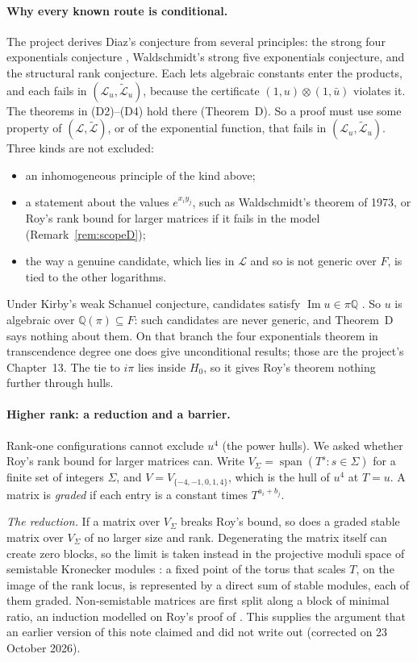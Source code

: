 \documentclass[11pt,a4paper]{article}
\theoremstyle{plain}
\theoremstyle{definition}
\newcommand{\Q}{\mathbb{Q}}
\newcommand{\cL}{\mathcal{L}}
\newcommand{\Lt}{\widetilde{\mathcal{L}}}
\newcommand{\spn}{\operatorname{span}}
\renewcommand{\Im}{\operatorname{Im}}
\begin{document}
\paragraph{Why every known route is conditional.}
The project derives Diaz's conjecture from several principles: the strong four
exponentials conjecture \cite[Conj.~11.17]{Wal00}, Waldschmidt's strong five exponentials
conjecture, and the structural rank conjecture. Each lets algebraic constants enter the
products, and each fails in $(\cL_{u},\Lt_{u})$, because the certificate
$(1,u)\otimes(1,\bar u)$ violates it. The theorems in (D2)--(D4) hold there (Theorem~D).
So a proof must use some property of $(\cL,\Lt)$, or of the exponential function, that
fails in $(\cL_{u},\Lt_{u})$. Three kinds are not excluded:
\begin{itemize}
\item an inhomogeneous principle of the kind above;
\item a statement about the values $e^{x_{i}y_{j}}$, such as Waldschmidt's theorem of
1973, or Roy's rank bound for larger matrices if it fails in the model
(Remark~\ref{rem:scopeD});
\item the way a genuine candidate, which lies in $\cL$ and so is not generic over $F$,
is tied to the other logarithms.
\end{itemize}
Under Kirby's weak Schanuel conjecture, candidates satisfy $\Im u\in\pi\Q$
\cite[Prop.~13.20]{BP}. So $u$ is algebraic over $\Q(\pi)\subseteq F$: such candidates are
never generic, and Theorem~D says nothing about them. On that branch the
four exponentials theorem in transcendence degree one does give unconditional results;
those are the project's Chapter~13. The tie to $i\pi$ lies inside $H_{0}$, so it gives
Roy's theorem nothing further through hulls.

\paragraph{Higher rank: a reduction and a barrier.}
Rank-one configurations cannot exclude $u^{4}$ (the power hulls). We asked whether Roy's rank
bound for larger matrices can. Write $V_{\Sigma}=\spn(T^{s}:s\in\Sigma)$ for a finite set of
integers $\Sigma$, and $V=V_{\{-4,-1,0,1,4\}}$, which is the hull of $u^{4}$ at $T=u$. A matrix is \emph{graded} if each entry is a constant times
$T^{a_{i}+b_{j}}$.

\emph{The reduction.} If a matrix over $V_{\Sigma}$ breaks Roy's bound, so does a graded stable
matrix over $V_{\Sigma}$ of no larger size and rank. Degenerating the matrix itself can create
zero blocks, so the limit is taken instead in the projective moduli space of semistable
Kronecker modules \cite{Kin94,MFK}: a fixed point of the torus that scales $T$, on the image of
the rank locus, is represented by a direct sum of stable modules, each of them graded.
Non-semistable matrices are first split along a block of minimal ratio, an induction modelled on
Roy's proof of \cite[Th.~5]{Roy92}. This supplies the argument that an earlier version of this note claimed and
did not write out (corrected on 23 October 2026).
\end{document}
